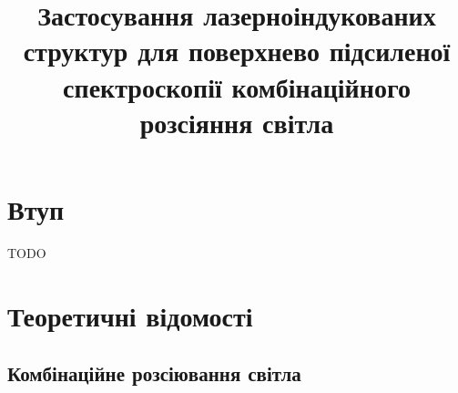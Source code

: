 \documentclass[a4paper]{article}
\begin{document}
    \title{Застосування лазерноіндукованих структур для поверхнево підсиленої спектроскопії комбінаційного розсіяння світла}
    \maketitle
    \section{Втуп}
        TODO
    \section{Теоретичні відомості}
        \subsection{Комбінаційне розсіювання світла}
\end{document}
